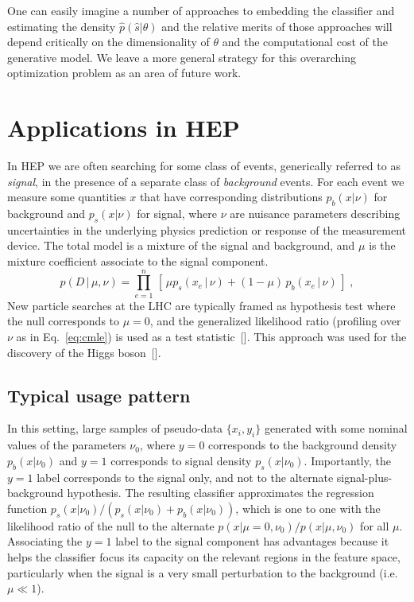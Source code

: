 \documentclass[aoas,preprint]{imsart}
\newcommand{\citek}[1]{[\cite{#1}]}
\numberwithin{equation}{section}
\theoremstyle{plain}
\begin{document}
One can easily imagine a number of approaches to embedding the classifier and estimating the density $\hat p(\hat s|\theta)$ and the relative merits of those approaches will depend critically on the dimensionality of $\theta$ and the computational cost of the generative model. We leave a more general strategy for this overarching optimization problem as an area of future work.

\section{Applications in HEP}

In HEP we are often searching for some 
class of events, generically referred to as \textit{signal}, in the presence of a separate class 
of \textit{background} events.  For each event we measure some quantities $x$ that have corresponding distributions 
$p_b(x|\nu)$ for background and $p_s(x|\nu)$ for signal, where $\nu$ are nuisance parameters describing 
uncertainties in the underlying physics prediction or response of the measurement device. The 
total model is a mixture of the signal and background, and $\mu$ is the mixture coefficient associate 
to the signal component. 
\begin{equation}\label{eq:hepGen}
p( D \,|\, \mu, \nu) = \prod_{e=1}^n \, \left[\, \mu p_s( x_e \, |\,  \nu)  + (1-\mu)\, p_b( x_e \,|\, \nu) \,\right] \; ,
\end{equation}
New particle searches at the LHC are typically framed as hypothesis test where the null corresponds to $\mu=0$, and the
generalized likelihood ratio (profiling over $\nu$ as in Eq.~\ref{eq:cmle}) is used as a test statistic~\citek{Cowan:2010js}. This approach was used for the discovery of the Higgs boson~\citek{Aad:2012tfa,Chatrchyan:2012ufa}.


\subsection{Typical usage pattern}

In this setting, large samples of pseudo-data $\{x_i, y_i\}$ generated with some nominal values of the parameters $\nu_0$, where $y=0$ corresponds to the background density $p_b(x|\nu_0)$  and $y=1$ corresponds to signal density $p_s(x|\nu_0)$. Importantly, the $y=1$ label corresponds to the signal only, and not to the alternate signal-plus-background hypothesis. The resulting classifier approximates the regression function $p_s(x|\nu_0)/(p_s(x|\nu_0)+p_b(x|\nu_0))$, which is one to one with the likelihood ratio of the null to the alternate $p(x|\mu=0,\nu_0)/p(x|\mu,\nu_0)$ for all $\mu$. Associating the $y=1$ label to the signal component has advantages because it helps the classifier focus its capacity on the relevant regions in the feature space, particularly when the signal is a very small perturbation to the background (i.e. $\mu \ll 1$). 
\end{document}
